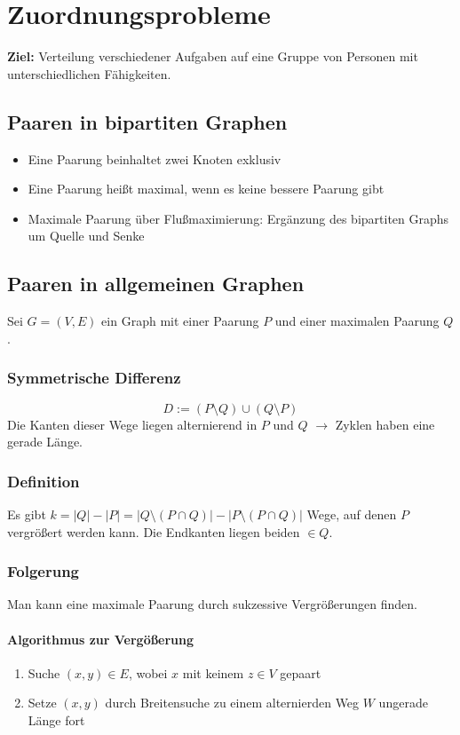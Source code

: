 \section{Zuordnungsprobleme}
\textbf{Ziel:} Verteilung verschiedener Aufgaben auf eine Gruppe von Personen mit unterschiedlichen Fähigkeiten.

\subsection{Paaren in bipartiten Graphen}
\begin{itemize}
	\item Eine Paarung beinhaltet zwei Knoten exklusiv
	\item Eine Paarung heißt maximal, wenn es keine bessere Paarung gibt
	\item Maximale Paarung über Flußmaximierung: Ergänzung des bipartiten Graphs um Quelle und Senke
\end{itemize}


\subsection{Paaren in allgemeinen Graphen}
Sei \(G=(V,E)\) ein Graph mit einer Paarung \(P\) und einer maximalen Paarung \(Q\).

\subsubsection{Symmetrische Differenz}
\[D:=(P\setminus Q) \cup (Q \setminus P)\]
Die Kanten dieser Wege liegen alternierend in \(P\) und \(Q\) \(\rightarrow\) Zyklen haben eine gerade Länge.

\subsubsection{Definition}
Es gibt \(k= |Q|-|P|=|Q\setminus (P \cap Q)| - |P\setminus (P \cap Q)|\) Wege, auf denen \(P\) vergrößert werden kann. Die Endkanten liegen beiden \(\in Q\).

\subsubsection{Folgerung}
Man kann eine maximale Paarung durch sukzessive Vergrößerungen finden.

\paragraph{Algorithmus zur Vergößerung}
\begin{enumerate}
	\item Suche \((x,y) \in E\), wobei \(x\) mit keinem \(z\in V\) gepaart
	\item Setze \((x,y)\) durch Breitensuche zu einem alternierden Weg \(W\) ungerade Länge fort
\end{enumerate}

